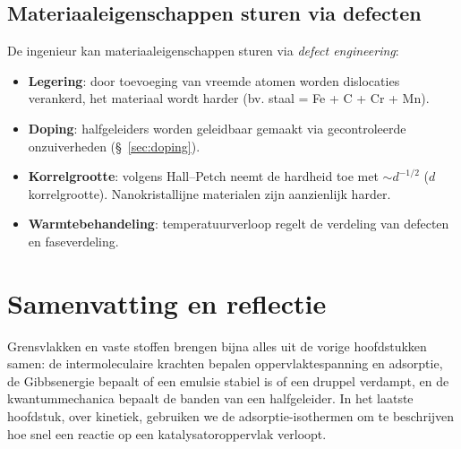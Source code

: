 \subsection{Materiaaleigenschappen sturen via defecten}
\label{sec:materiaal-defecten}

De ingenieur kan materiaaleigenschappen sturen via \emph{defect engineering}:

\begin{itemize}
\item \textbf{Legering}: door toevoeging van vreemde atomen worden dislocaties verankerd, het materiaal wordt harder (bv. staal = Fe + C + Cr + Mn).
\item \textbf{Doping}: halfgeleiders worden geleidbaar gemaakt via gecontroleerde onzuiverheden (\S~\ref{sec:doping}).
\item \textbf{Korrelgrootte}: volgens Hall--Petch neemt de hardheid toe met $\sim d^{-1/2}$ ($d$ korrelgrootte). Nanokristallijne materialen zijn aanzienlijk harder.
\item \textbf{Warmtebehandeling}: temperatuurverloop regelt de verdeling van defecten en faseverdeling.
\end{itemize}


\section{Samenvatting en reflectie}

Grensvlakken en vaste stoffen brengen bijna alles uit de vorige hoofdstukken samen: de intermoleculaire krachten bepalen oppervlaktespanning en adsorptie, de Gibbsenergie bepaalt of een emulsie stabiel is of een druppel verdampt, en de kwantummechanica bepaalt de banden van een halfgeleider. In het laatste hoofdstuk, over kinetiek, gebruiken we de adsorptie-isothermen om te beschrijven hoe snel een reactie op een katalysatoroppervlak verloopt.

